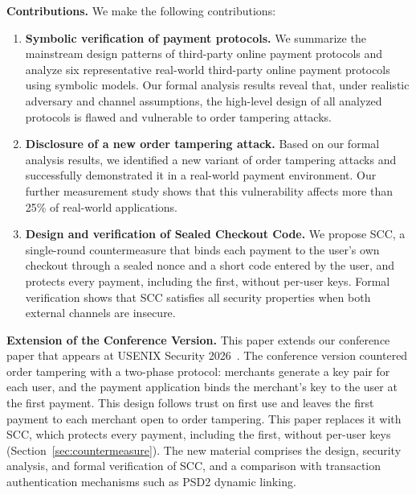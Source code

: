 \noindent\textbf{Contributions.}
We make the following contributions:
\begin{enumerate}[leftmargin=*]
  \item \textbf{Symbolic verification of payment protocols.}
    We summarize the mainstream design patterns of third-party online payment protocols and analyze six representative real-world third-party online payment protocols using symbolic models.
    Our formal analysis results reveal that, under realistic adversary and channel assumptions, the high-level design of all analyzed protocols is flawed and vulnerable to order tampering attacks.
  \item \textbf{Disclosure of a new order tampering attack.}
    Based on our formal analysis results, we identified a new variant of order tampering attacks and successfully demonstrated it in a real-world payment environment.
    Our further measurement study shows that this vulnerability affects more than 25\% of real-world applications.
  \item \textbf{Design and verification of Sealed Checkout Code.}
    We propose SCC, a single-round countermeasure that binds each payment to the user's own checkout through a sealed nonce and a short code entered by the user, and protects every payment, including the first, without per-user keys.
    Formal verification shows that SCC satisfies all security properties when both external channels are insecure.
\end{enumerate}

\noindent\textbf{Extension of the Conference Version.}
This paper extends our conference paper that appears at USENIX Security 2026~\cite{xiao2026authorization}.
The conference version countered order tampering with a two-phase protocol: merchants generate a key pair for each user, and the payment application binds the merchant's key to the user at the first payment.
This design follows trust on first use and leaves the first payment to each merchant open to order tampering.
This paper replaces it with SCC, which protects every payment, including the first, without per-user keys (Section~\ref{sec:countermeasure}).
The new material comprises the design, security analysis, and formal verification of SCC, and a comparison with transaction authentication mechanisms such as PSD2 dynamic linking.


